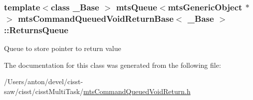 \subsubsection[{Returns\+Queue}]{\setlength{\rightskip}{0pt plus 5cm}template$<$class \+\_\+\+Base $>$ {\bf mts\+Queue}$<${\bf mts\+Generic\+Object} $\ast$$>$ {\bf mts\+Command\+Queued\+Void\+Return\+Base}$<$ \+\_\+\+Base $>$\+::Returns\+Queue\hspace{0.3cm}{\ttfamily [protected]}}\label{classmts_command_queued_void_return_base_a9926c9d6613de0a461be38fcb5739be5}
Queue to store pointer to return value 

The documentation for this class was generated from the following file\+:\begin{DoxyCompactItemize}
\item 
/\+Users/anton/devel/cisst-\/saw/cisst/cisst\+Multi\+Task/\hyperlink{mts_command_queued_void_return_8h}{mts\+Command\+Queued\+Void\+Return.\+h}\end{DoxyCompactItemize}
